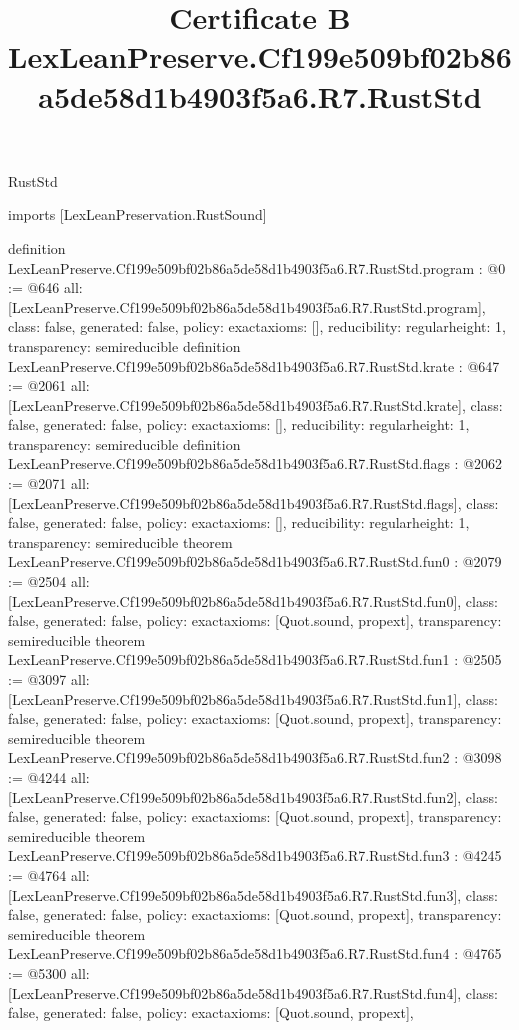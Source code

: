 \begin{lexlean}{RustStd}
\title{Certificate B LexLeanPreserve.Cf199e509bf02b86a5de58d1b4903f5a6.R7.RustStd}
\begin{coremodule}
imports [LexLeanPreservation.RustSound]

definition LexLeanPreserve.Cf199e509bf02b86a5de58d1b4903f5a6.R7.RustStd.program : @0 := @646 {
  all: [LexLeanPreserve.Cf199e509bf02b86a5de58d1b4903f5a6.R7.RustStd.program],
  class: false,
  generated: false,
  policy: exact{axioms: []},
  reducibility: regular{height: 1},
  transparency: semireducible
}
definition LexLeanPreserve.Cf199e509bf02b86a5de58d1b4903f5a6.R7.RustStd.krate : @647 := @2061 {
  all: [LexLeanPreserve.Cf199e509bf02b86a5de58d1b4903f5a6.R7.RustStd.krate],
  class: false,
  generated: false,
  policy: exact{axioms: []},
  reducibility: regular{height: 1},
  transparency: semireducible
}
definition LexLeanPreserve.Cf199e509bf02b86a5de58d1b4903f5a6.R7.RustStd.flags : @2062 := @2071 {
  all: [LexLeanPreserve.Cf199e509bf02b86a5de58d1b4903f5a6.R7.RustStd.flags],
  class: false,
  generated: false,
  policy: exact{axioms: []},
  reducibility: regular{height: 1},
  transparency: semireducible
}
theorem LexLeanPreserve.Cf199e509bf02b86a5de58d1b4903f5a6.R7.RustStd.fun0 : @2079 := @2504 {
  all: [LexLeanPreserve.Cf199e509bf02b86a5de58d1b4903f5a6.R7.RustStd.fun0],
  class: false,
  generated: false,
  policy: exact{axioms: [Quot.sound, propext]},
  transparency: semireducible
}
theorem LexLeanPreserve.Cf199e509bf02b86a5de58d1b4903f5a6.R7.RustStd.fun1 : @2505 := @3097 {
  all: [LexLeanPreserve.Cf199e509bf02b86a5de58d1b4903f5a6.R7.RustStd.fun1],
  class: false,
  generated: false,
  policy: exact{axioms: [Quot.sound, propext]},
  transparency: semireducible
}
theorem LexLeanPreserve.Cf199e509bf02b86a5de58d1b4903f5a6.R7.RustStd.fun2 : @3098 := @4244 {
  all: [LexLeanPreserve.Cf199e509bf02b86a5de58d1b4903f5a6.R7.RustStd.fun2],
  class: false,
  generated: false,
  policy: exact{axioms: [Quot.sound, propext]},
  transparency: semireducible
}
theorem LexLeanPreserve.Cf199e509bf02b86a5de58d1b4903f5a6.R7.RustStd.fun3 : @4245 := @4764 {
  all: [LexLeanPreserve.Cf199e509bf02b86a5de58d1b4903f5a6.R7.RustStd.fun3],
  class: false,
  generated: false,
  policy: exact{axioms: [Quot.sound, propext]},
  transparency: semireducible
}
theorem LexLeanPreserve.Cf199e509bf02b86a5de58d1b4903f5a6.R7.RustStd.fun4 : @4765 := @5300 {
  all: [LexLeanPreserve.Cf199e509bf02b86a5de58d1b4903f5a6.R7.RustStd.fun4],
  class: false,
  generated: false,
  policy: exact{axioms: [Quot.sound, propext]},
}
\end{coremodule}
\end{lexlean}
